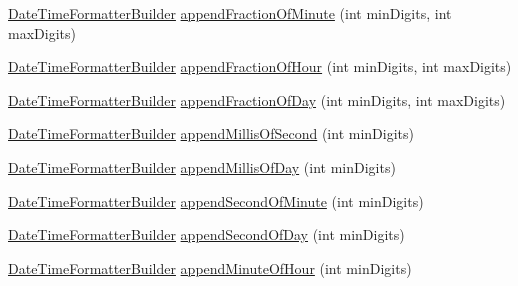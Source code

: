 \begin{DoxyCompactItemize}
\item 
\hyperlink{classorg_1_1joda_1_1time_1_1format_1_1_date_time_formatter_builder}{Date\-Time\-Formatter\-Builder} \hyperlink{classorg_1_1joda_1_1time_1_1format_1_1_date_time_formatter_builder_a8aa92a658a45a5b9afe2d65d33a13582}{append\-Fraction\-Of\-Minute} (int min\-Digits, int max\-Digits)
\item 
\hyperlink{classorg_1_1joda_1_1time_1_1format_1_1_date_time_formatter_builder}{Date\-Time\-Formatter\-Builder} \hyperlink{classorg_1_1joda_1_1time_1_1format_1_1_date_time_formatter_builder_a661c39ef2d5cbcb81c4a7055879a98b1}{append\-Fraction\-Of\-Hour} (int min\-Digits, int max\-Digits)
\item 
\hyperlink{classorg_1_1joda_1_1time_1_1format_1_1_date_time_formatter_builder}{Date\-Time\-Formatter\-Builder} \hyperlink{classorg_1_1joda_1_1time_1_1format_1_1_date_time_formatter_builder_a3135b1d839cef1e8c1b546ef9c20bd63}{append\-Fraction\-Of\-Day} (int min\-Digits, int max\-Digits)
\item 
\hyperlink{classorg_1_1joda_1_1time_1_1format_1_1_date_time_formatter_builder}{Date\-Time\-Formatter\-Builder} \hyperlink{classorg_1_1joda_1_1time_1_1format_1_1_date_time_formatter_builder_abde90ebdcc0f9c2542a08f2c064d859e}{append\-Millis\-Of\-Second} (int min\-Digits)
\item 
\hyperlink{classorg_1_1joda_1_1time_1_1format_1_1_date_time_formatter_builder}{Date\-Time\-Formatter\-Builder} \hyperlink{classorg_1_1joda_1_1time_1_1format_1_1_date_time_formatter_builder_ad9a6155ceb4257c3a4dc031efb386aee}{append\-Millis\-Of\-Day} (int min\-Digits)
\item 
\hyperlink{classorg_1_1joda_1_1time_1_1format_1_1_date_time_formatter_builder}{Date\-Time\-Formatter\-Builder} \hyperlink{classorg_1_1joda_1_1time_1_1format_1_1_date_time_formatter_builder_ae48c5ecf3a1e24b297bf82c8e64f41d5}{append\-Second\-Of\-Minute} (int min\-Digits)
\item 
\hyperlink{classorg_1_1joda_1_1time_1_1format_1_1_date_time_formatter_builder}{Date\-Time\-Formatter\-Builder} \hyperlink{classorg_1_1joda_1_1time_1_1format_1_1_date_time_formatter_builder_aaea9a9bb7985b2b755b95dba62339795}{append\-Second\-Of\-Day} (int min\-Digits)
\item 
\hyperlink{classorg_1_1joda_1_1time_1_1format_1_1_date_time_formatter_builder}{Date\-Time\-Formatter\-Builder} \hyperlink{classorg_1_1joda_1_1time_1_1format_1_1_date_time_formatter_builder_a0bf8fed5c4c74ba0e509d4a113018cef}{append\-Minute\-Of\-Hour} (int min\-Digits)
\item 

\end{DoxyCompactItemize}
